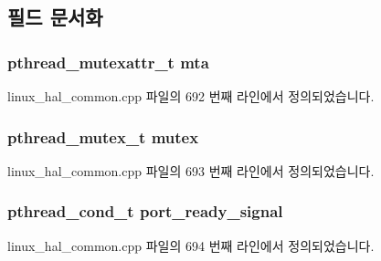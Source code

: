 \subsection{필드 문서화}
\subsubsection[{\texorpdfstring{mta}{mta}}]{\setlength{\rightskip}{0pt plus 5cm}pthread\+\_\+mutexattr\+\_\+t mta}\hypertarget{struct_linux_lock_private_a3b2e3466cff7f96f4489a59be85aed1f}{}\label{struct_linux_lock_private_a3b2e3466cff7f96f4489a59be85aed1f}


linux\+\_\+hal\+\_\+common.\+cpp 파일의 692 번째 라인에서 정의되었습니다.

\subsubsection[{\texorpdfstring{mutex}{mutex}}]{\setlength{\rightskip}{0pt plus 5cm}pthread\+\_\+mutex\+\_\+t mutex}\hypertarget{struct_linux_lock_private_a4acff8232e4aec9cd5c6dc200ac55ef3}{}\label{struct_linux_lock_private_a4acff8232e4aec9cd5c6dc200ac55ef3}


linux\+\_\+hal\+\_\+common.\+cpp 파일의 693 번째 라인에서 정의되었습니다.

\subsubsection[{\texorpdfstring{port\+\_\+ready\+\_\+signal}{port_ready_signal}}]{\setlength{\rightskip}{0pt plus 5cm}pthread\+\_\+cond\+\_\+t port\+\_\+ready\+\_\+signal}\hypertarget{struct_linux_lock_private_a661b628f98aeac53e3761d30a8201add}{}\label{struct_linux_lock_private_a661b628f98aeac53e3761d30a8201add}


linux\+\_\+hal\+\_\+common.\+cpp 파일의 694 번째 라인에서 정의되었습니다.

